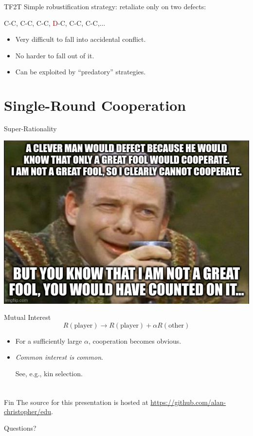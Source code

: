 \documentclass[pdf]{beamer}
\makeatletter
\def\beamer@writeslidentry@miniframesoff{%
  \expandafter\beamer@ifempty\expandafter{\beamer@framestartpage}{}%
  {%
    \clearpage\beamer@notesactions%
  }
}
\newcommand*{\miniframesoff}{\let\beamer@writeslidentry=\beamer@writeslidentry@miniframesoff}
\makeatother
\begin{document}
\begin{frame}{TF2T}
  Simple robustification strategy: retaliate only on two defects:\pause
  
  C-C\pause, C-C\pause, C-C\pause, \textcolor{darkred}{D}-C\pause, C-C\pause, C-C\pause,$\ldots$

  \begin{itemize}
  \item Very difficult to fall into accidental conflict.
    \pause
  \item No harder to fall out of it.
    \pause
  \item Can be exploited by ``predatory'' strategies.
  \end{itemize}
  
\end{frame}

\section{Single-Round Cooperation}
\begin{frame}{Super-Rationality}
  \begin{center}
    \includegraphics[scale=0.3]{vizzini.jpg}
  \end{center}
\end{frame}

\begin{frame}{Mutual Interest}
  \[ R(\text{player}) \rightarrow R(\text{player}) + \alpha R(\text{other}) \]

  \begin{itemize}
  \item For a sufficiently large $\alpha$, cooperation becomes obvious.\pause
  \item \emph{Common interest is common}.
    \begin{itemize}
      See, e.g., kin selection.
    \end{itemize}
  \end{itemize}
\end{frame}


\miniframesoff
\section*{}

\begin{frame}{Fin}
  The source for this presentation is hosted at
\url{https://github.com/alan-christopher/edu}.\newline

  Questions?
\end{frame}
\end{document}
